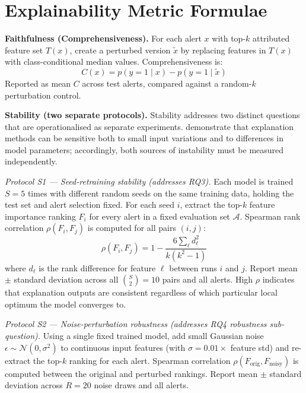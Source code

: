 \documentclass[12pt,a4paper]{report}
\begin{document}
\chapter{Explainability Metric Formulae}
\label{app:formulae}

\noindent\textbf{Faithfulness (Comprehensiveness).} For each alert $x$ with top-$k$ attributed feature set $T(x)$, create a perturbed version $\tilde{x}$ by replacing features in $T(x)$ with class-conditional median values. Comprehensiveness is:
\begin{equation}
C(x) = p(y=1 \mid x) - p(y=1 \mid \tilde{x})
\end{equation}
Reported as mean $C$ across test alerts, compared against a random-$k$ perturbation control.

\vspace{1em}
\noindent\textbf{Stability (two separate protocols).} Stability addresses two distinct questions that are operationalised as separate experiments. \citet{alvarez2018} demonstrate that explanation methods can be sensitive both to small input variations and to differences in model parameters; accordingly, both sources of instability must be measured independently.

\noindent\textit{Protocol S1 --- Seed-retraining stability (addresses RQ3).} Each model is trained $S = 5$ times with different random seeds on the same training data, holding the test set and alert selection fixed. For each seed $i$, extract the top-$k$ feature importance ranking $F_i$ for every alert in a fixed evaluation set $\mathcal{A}$. Spearman rank correlation $\rho(F_i, F_j)$ is computed for all pairs $(i, j)$:
\begin{equation}
\rho(F_i, F_j) = 1 - \frac{6 \sum_\ell d_\ell^2}{k(k^2 - 1)}
\end{equation}
where $d_\ell$ is the rank difference for feature $\ell$ between runs $i$ and $j$. Report mean $\pm$ standard deviation across all $\binom{S}{2} = 10$ pairs and all alerts. High $\rho$ indicates that explanation outputs are consistent regardless of which particular local optimum the model converges to.

\noindent\textit{Protocol S2 --- Noise-perturbation robustness (addresses RQ4 robustness sub-question).} Using a single fixed trained model, add small Gaussian noise $\epsilon \sim \mathcal{N}(0, \sigma^2)$ to continuous input features (with $\sigma = 0.01 \times$ feature std) and re-extract the top-$k$ ranking for each alert. Spearman correlation $\rho(F_{\text{orig}}, F_{\text{noisy}})$ is computed between the original and perturbed rankings. Report mean $\pm$ standard deviation across $R = 20$ noise draws and all alerts.
\end{document}
